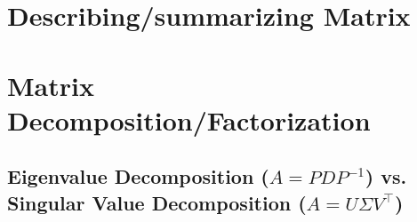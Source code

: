 \section{Describing/summarizing Matrix}







\section{Matrix Decomposition/Factorization}





\subsection{Eigenvalue Decomposition ($A = P DP ^{-1}$) vs. Singular Value Decomposition ($A = U \Sigma V^\top$)}


